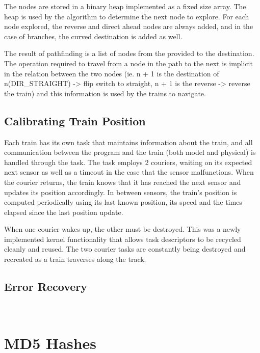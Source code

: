 \documentclass[12pt]{article}
\begin{document}
The nodes are stored in a binary heap implemented as a fixed size array. The heap is used by the algorithm to determine
the next node to explore. For each node explored, the reverse and direct ahead nodes are always added, and in the case
of branches, the curved destination is added as well.

The result of pathfinding is a list of nodes from the provided to the destination. The operation required to travel from
a node in the path to the next is implicit in the relation between the two nodes (ie. n + 1 is the destination of
n(DIR\_STRAIGHT) -> flip switch to straight, n + 1 is the reverse -> reverse the train) and this information is used by
the trains to navigate.
\\[1\baselineskip]
\subsection{Calibrating Train Position}
Each train has its own task that maintains information about the train, and all communication between the program and
the train (both model and physical) is handled through the task. The task employs 2 couriers, waiting on its expected
next sensor as well as a timeout in the case that the sensor malfunctions. When the courier returns, the train knows
that it has reached the next sensor and updates its position accordingly. In between sensors, the train's position is
computed periodically using its last known position, its speed and the times elapsed since the last position update.

When one courier wakes up, the other must be destroyed. This was a newly implemented kernel functionality that allows
task descriptors to be recycled cleanly and reused. The two courier tasks are constantly being destroyed and recreated
as a train traverses along the track.
\\[1\baselineskip]
\subsection{Error Recovery}
\\[2\baselineskip]
\section{MD5 Hashes}

\end{document}
